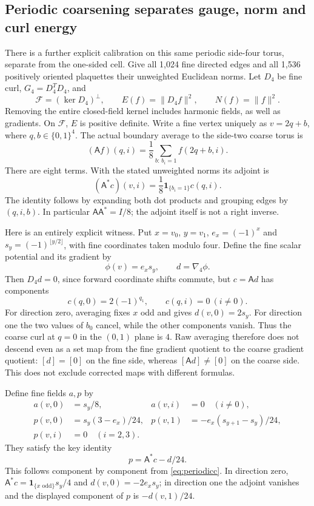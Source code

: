 \documentclass[11pt]{article}
\begin{document}
\subsection*{Periodic coarsening separates gauge, norm and curl energy}
There is a further explicit calibration on this same periodic side-four
torus, separate from the one-sided cell. Give all 1,024 fine directed
edges and all 1,536 positively oriented plaquettes their unweighted
Euclidean norms. Let $D_4$ be fine curl, $G_4=D_4^TD_4$, and
\[
 \mathcal F=(\ker D_4)^\perp,\qquad
 E(f)=\|D_4f\|^2,\qquad N(f)=\|f\|^2.
\]
Removing the entire closed-field kernel includes harmonic fields, as well
as gradients. On $\mathcal F$, $E$ is positive definite. Write a fine
vertex uniquely as $v=2q+b$, where $q,b\in\{0,1\}^4$. The actual
boundary average to the side-two coarse torus is
\[
 (\mathsf A f)(q,i)=\frac18\sum_{b:\,b_i=1}f(2q+b,i).
\]
There are eight terms. With the stated unweighted norms its adjoint is
\[
 (\mathsf A^*c)(v,i)=\frac18\mathbf1_{\{b_i=1\}}c(q,i).
\]
The identity follows by expanding both dot products and grouping edges
by $(q,i,b)$. In particular $\mathsf A\mathsf A^*=I/8$; the adjoint
itself is not a right inverse.

Here is an entirely explicit witness. Put $x=v_0$, $y=v_1$,
$e_x=(-1)^x$ and $s_y=(-1)^{\lfloor y/2\rfloor}$, with fine coordinates
taken modulo four. Define the fine scalar potential and its gradient by
\[
 \phi(v)=e_xs_y,\qquad d=\nabla_4\phi.
\]
Then $D_4d=0$, since forward coordinate shifts commute, but $c=\mathsf A d$
has components
\begin{equation}\label{eq:periodicc}
 c(q,0)=2(-1)^{q_1},\qquad c(q,i)=0\ (i\ne0).
\end{equation}
For direction zero, averaging fixes $x$ odd and gives $d(v,0)=2s_y$.
For direction one the two values of $b_0$ cancel, while the other
components vanish. Thus the coarse curl at $q=0$ in the $(0,1)$ plane
is $4$. Raw averaging therefore does not descend even as a set map
from the fine gradient quotient to the coarse gradient quotient:
$[d]=[0]$ on the fine side, whereas $[\mathsf A d]\ne[0]$ on the
coarse side. This does not exclude corrected maps with different formulas.

Define fine fields $a,p$ by
\begin{align}
 a(v,0)&=s_y/8,& a(v,i)&=0\quad(i\ne0),\label{eq:periodica}\\
 p(v,0)&=s_y(3-e_x)/24,&
 p(v,1)&=-e_x(s_{y+1}-s_y)/24,\label{eq:periodicp}\\
 p(v,i)&=0\quad(i=2,3).&&\nonumber
\end{align}
They satisfy the key identity
\begin{equation}\label{eq:periodicadjoint}
 p=\mathsf A^*c-d/24.
\end{equation}
This follows component by component from \eqref{eq:periodicc}. In direction
zero, $\mathsf A^*c=\mathbf1_{\{x\text{ odd}\}}s_y/4$ and
$d(v,0)=-2e_xs_y$; in direction one the adjoint vanishes and the
displayed component of $p$ is $-d(v,1)/24$.
\end{document}
